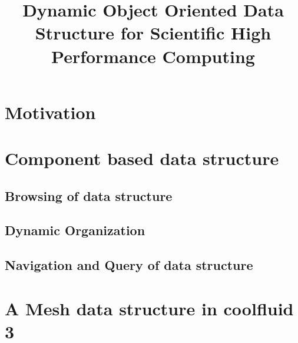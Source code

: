 \documentclass[12pt]{scrartcl}
\title{Dynamic Object Oriented Data Structure for Scientific High Performance Computing}
\author{}
\begin{document}
  \maketitle  
  \tableofcontents
  
  \section{Motivation}
  
  \section{Component based data structure}
  
  \subsection{Browsing of data structure}
  



  \subsection{Dynamic Organization}
  


  
  \subsection{Navigation and Query of data structure}
  
  



  \section{A Mesh data structure in coolfluid 3}
  
\end{document}
